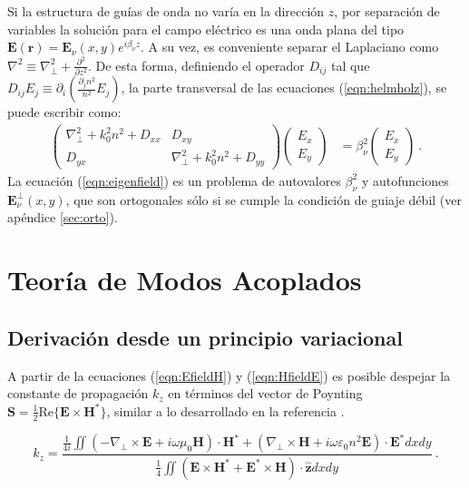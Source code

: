 Si la estructura de guías de onda no varía en la dirección $z$, por separación de variables la solución para el campo eléctrico es una onda plana del tipo $\textbf{E}(\textbf{r}) = \textbf{E}_\nu(x, y) e^{i\beta_\nu z}$. A su vez, es conveniente separar el Laplaciano como $\nabla^2 \equiv \nabla_\perp^2 + \frac{\partial^2}{\partial z^2}$. De esta forma, definiendo el operador $D_{ij}$ tal que $D_{ij} E_j \equiv \partial_i\left(\frac{\partial_j n^2}{n^2}E_j \right) $, la parte transversal de las ecuaciones (\ref{eqn:helmholz}), se puede escribir como:
\begin{align}
	\begin{pmatrix}
	\nabla_\perp^2  + k_0^2n^2 + D_{xx} & D_{xy} 
	\\
	D_{yx}  & \nabla_\perp^2  + k_0^2n^2 + D_{yy} 
	\end{pmatrix}
	\begin{pmatrix}
	E_x
	\\
	E_y
	\end{pmatrix}
		&=
	\beta_\nu^2 
	\begin{pmatrix}
	E_x
	\\
	E_y
	\end{pmatrix} \ . \label{eqn:eigenfield}
\end{align}
La ecuación (\ref{eqn:eigenfield}) es un problema de autovalores $\beta_\nu^2$ y autofunciones $\textbf{E}_\nu^\perp(x,y)$, que son ortogonales sólo si se cumple la condición de guiaje débil (ver apéndice \ref{sec:orto}). 

\section{Teoría de Modos Acoplados}
\subsection{Derivación desde un principio variacional}

A partir de la ecuaciones (\ref{eqn:EfieldH}) y (\ref{eqn:HfieldE}) es posible despejar la constante de propagación $k_z$ en términos del vector de Poynting $\textbf{S} = \frac{1}{2} \text{Re}\{\textbf{E} \times \textbf{H}^*\}$, similar a lo desarrollado en la referencia \citep{haus_coupled-mode}.

\begin{equation}
	k_z = \frac{\frac{1}{4i}\iint \left(-\nabla_\perp \times \textbf{E} + i\omega \mu_0 \textbf{H} \right)\cdot\textbf{H}^* + \left(\nabla_\perp\times\textbf{H} + i\omega \varepsilon_0 n^2 \textbf{E} \right)\cdot \textbf{E}^* dxdy}{\frac{1}{4} \iint \left( \textbf{E}\times\textbf{H}^* + \textbf{E}^*\times\textbf{H}  \right) \cdot \hat{\textbf{z}} dxdy} \ . \label{eqn:kzprevar}
\end{equation}

